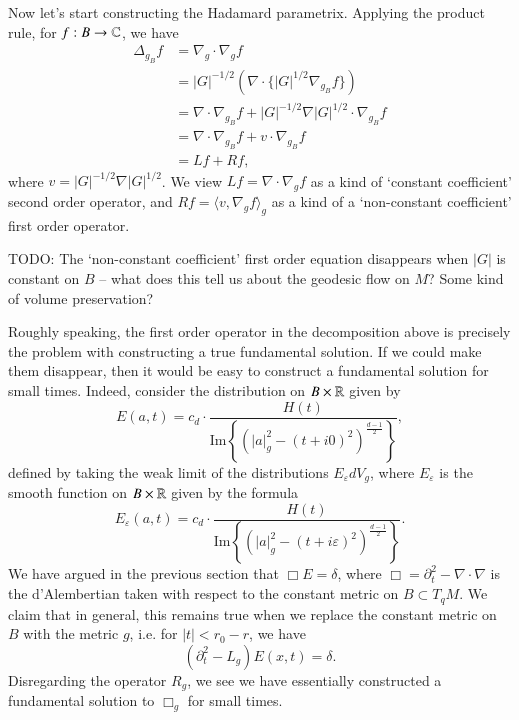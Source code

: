 Now let's start constructing the Hadamard parametrix. Applying the product rule, for $f: B \to \operatorname{\mathbb{C}}$, we have
%
\begin{align*}
    \Delta_{g_B} f &= \nabla_g \cdot \nabla_g f\\
    &= |G|^{-1/2} \left( \nabla \cdot \{ |G|^{1/2} \nabla_{g_B} f \} \right)\\
    &= \nabla \cdot \nabla_{g_B} f + |G|^{-1/2} \nabla |G|^{1/2} \cdot \nabla_{g_B} f\\
    &= \nabla \cdot \nabla_{g_B} f + v \cdot \nabla_{g_B} f\\
    &= Lf + Rf,
\end{align*}
%
where $v = |G|^{-1/2} \nabla |G|^{1/2}$. We view $Lf = \nabla \cdot \nabla_g f$ as a kind of `constant coefficient' second order operator, and $R f = \langle v, \nabla_g f \rangle_g$ as a kind of a `non-constant coefficient' first order operator.

TODO: The `non-constant coefficient' first order equation disappears when $|G|$ is constant on $B$ -- what does this tell us about the geodesic flow on $M$? Some kind of volume preservation?

Roughly speaking, the first order operator in the decomposition above is precisely the problem with constructing a true fundamental solution. If we could make them disappear, then it would be easy to construct a fundamental solution for small times. Indeed, consider the distribution on $B \times \operatorname{\mathbb{R}}$ given by
%
\[ E(a,t) = c_d \cdot \frac{H(t)}{\text{Im} \left\{ (|a|^2_g - (t + i0)^2)^{\frac{d-1}{2}} \right\} }, \]
%
defined by taking the weak limit of the distributions $E_\varepsilon dV_g$, where $E_\varepsilon$ is the smooth function on $B \times \operatorname{\mathbb{R}}$ given by the formula
%
\[ E_\varepsilon(a,t) = c_d \cdot \frac{H(t)}{\text{Im} \left\{ (|a|^2_g - (t + i\varepsilon)^2)^{\frac{d-1}{2}} \right\} }. \]
%
We have argued in the previous section that $\Box E = \delta$, where $\Box = \partial_t^2 - \nabla \cdot \nabla$ is the d'Alembertian taken with respect to the constant metric on $B \subset T_q M$. We claim that in general, this remains true when we replace the constant metric on $B$ with the metric $g$, i.e. for $|t| < r_0 - r$, we have
%
\[ (\partial_t^2 - L_g) E(x,t) = \delta. \]
%
Disregarding the operator $R_g$, we see we have essentially constructed a fundamental solution to $\Box_g$ for small times.

